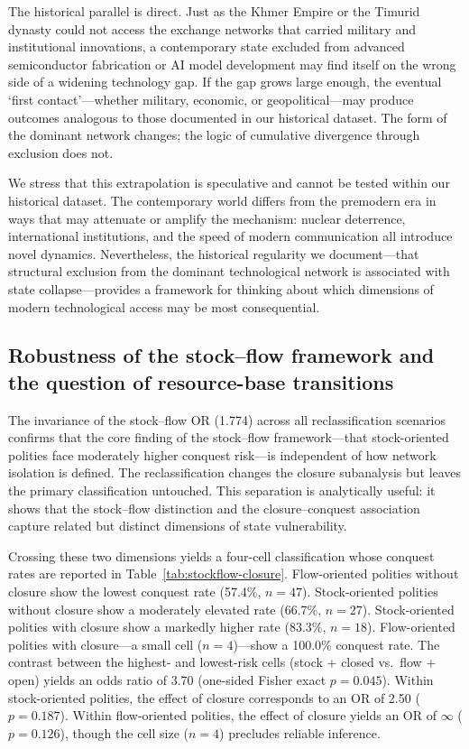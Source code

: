 \documentclass[pdflatex,sn-basic]{sn-jnl}
\theoremstyle{thmstyleone}%
\theoremstyle{thmstyletwo}%
\theoremstyle{thmstylethree}%
\begin{document}
The historical parallel is direct. Just as the Khmer Empire or the Timurid dynasty could not access the exchange networks that carried military and institutional innovations, a contemporary state excluded from advanced semiconductor fabrication or AI model development may find itself on the wrong side of a widening technology gap. If the gap grows large enough, the eventual `first contact'---whether military, economic, or geopolitical---may produce outcomes analogous to those documented in our historical dataset. The form of the dominant network changes; the logic of cumulative divergence through exclusion does not.

We stress that this extrapolation is speculative and cannot be tested within our historical dataset. The contemporary world differs from the premodern era in ways that may attenuate or amplify the mechanism: nuclear deterrence, international institutions, and the speed of modern communication all introduce novel dynamics. Nevertheless, the historical regularity we document---that structural exclusion from the dominant technological network is associated with state collapse---provides a framework for thinking about which dimensions of modern technological access may be most consequential.

\subsection{Robustness of the stock--flow framework and the question of resource-base transitions}\label{sec:disc-stockflow}

The invariance of the stock--flow OR (1.774) across all reclassification scenarios confirms that the core finding of the stock--flow framework---that stock-oriented polities face moderately higher conquest risk---is independent of how network isolation is defined. The reclassification changes the closure subanalysis but leaves the primary classification untouched. This separation is analytically useful: it shows that the stock--flow distinction and the closure--conquest association capture related but distinct dimensions of state vulnerability.

Crossing these two dimensions yields a four-cell classification whose conquest rates are reported in Table~\ref{tab:stockflow-closure}. Flow-oriented polities without closure show the lowest conquest rate (57.4\%, $n = 47$). Stock-oriented polities without closure show a moderately elevated rate (66.7\%, $n = 27$). Stock-oriented polities with closure show a markedly higher rate (83.3\%, $n = 18$). Flow-oriented polities with closure---a small cell ($n = 4$)---show a 100.0\% conquest rate. The contrast between the highest- and lowest-risk cells (stock + closed vs.\ flow + open) yields an odds ratio of 3.70 (one-sided Fisher exact $p = 0.045$). Within stock-oriented polities, the effect of closure corresponds to an OR of 2.50 ($p = 0.187$). Within flow-oriented polities, the effect of closure yields an OR of $\infty$ ($p = 0.126$), though the cell size ($n = 4$) precludes reliable inference.
\end{document}
